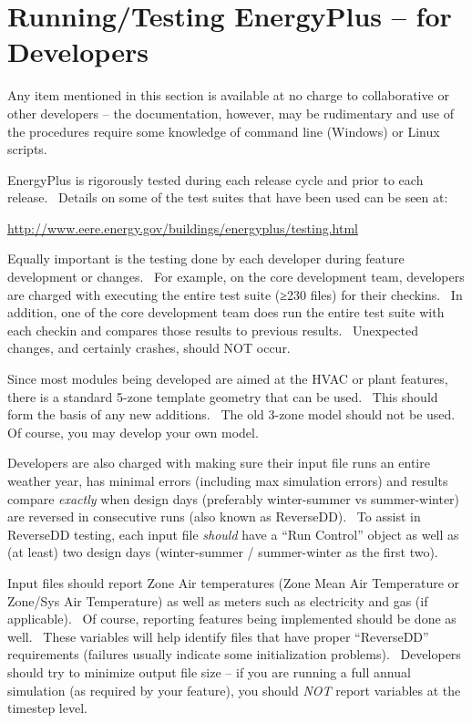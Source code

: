 \chapter{Running/Testing EnergyPlus -- for Developers}\label{runningtesting-energyplus-for-developers}

Any item mentioned in this section is available at no charge to collaborative or other developers -- the documentation, however, may be rudimentary and use of the procedures require some knowledge of command line (Windows) or Linux scripts.

EnergyPlus is rigorously tested during each release cycle and prior to each release.~ Details on some of the test suites that have been used can be seen at:

\url{http://www.eere.energy.gov/buildings/energyplus/testing.html}

Equally important is the testing done by each developer during feature development or changes.~ For example, on the core development team, developers are charged with executing the entire test suite (≥230 files) for their checkins.~ In addition, one of the core development team does run the entire test suite with each checkin and compares those results to previous results.~ Unexpected changes, and certainly crashes, should NOT occur.

Since most modules being developed are aimed at the HVAC or plant features, there is a standard 5-zone template geometry that can be used.~ This should form the basis of any new additions.~ The old 3-zone model should not be used.~ Of course, you may develop your own model.

Developers are also charged with making sure their input file runs an entire weather year, has minimal errors (including max simulation errors) and results compare \emph{exactly} when design days (preferably winter-summer vs summer-winter) are reversed in consecutive runs (also known as ReverseDD).~ To assist in ReverseDD testing, each input file \emph{should} have a ``Run Control'' object as well as (at least) two design days (winter-summer / summer-winter as the first two).

Input files should report Zone Air temperatures (Zone Mean Air Temperature or Zone/Sys Air Temperature) as well as meters such as electricity and gas (if applicable).~ Of course, reporting features being implemented should be done as well.~ These variables will help identify files that have proper ``ReverseDD'' requirements (failures usually indicate some initialization problems).~ Developers should try to minimize output file size -- if you are running a full annual simulation (as required by your feature), you should \emph{NOT} report variables at the timestep level.

